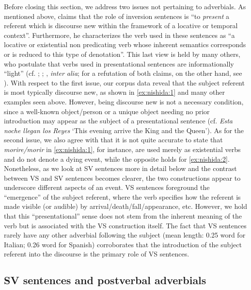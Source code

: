 \documentclass[output=paper,colorlinks,citecolor=brown,
]{langscibook}
\begin{document}
Before closing this section, we address two issues not pertaining to adverbials. As mentioned above, \citet[2, original italics]{cornish2005cross} claims that the role of inversion sentences is ``to \textit{present} a referent which is discourse new within the framework of a locative or temporal context''. Furthermore, he characterizes the verb used in these sentences as ``a locative or existential non predicating verb whose inherent semantics corresponds or is reduced to this type of denotation''. This last view is held by many others, who postulate that verbs used in presentational sentences are informationally ``light'' (cf. \citealt{suner1982}; \citealt{birner1994information}; \citealt{zubizarreta1998}, \textit{inter alia}; for a refutation of both claims, on the other hand, see \citealt{marandin2010subject}). With respect to the first issue, our corpus data reveal that the subject referent is most typically discourse new, as shown in \ref{ex:nishida:1} and many other examples seen above. However, being discourse new is not a necessary condition, since a well-known object/person or a unique object needing no prior introduction may appear as the subject of a presentational sentence (cf. \textit{Esta noche llegan los Reyes} `This evening arrive the King and the Queen'). As for the second issue, we also agree with \citet{marandin2010subject} that it is not quite accurate to state that \textit{morire/morir} in \ref{ex:nishida:1}, for instance, are used merely as existential verbs and do not denote a dying event, while the opposite holds for \ref{ex:nishida:2}. Nonetheless, as we look at SV sentences more in detail below and the contrast between VS and SV sentences becomes clearer, the two constructions appear to underscore different aspects of an event. VS sentences foreground the ``emergence'' of the subject referent, where the verb specifies how the referent is made visible (or audible) by arrival/death/fall/appearance, etc. However, we hold that this ``presentational'' sense does not stem from the inherent meaning of the verb but is associated with the VS construction itself. The fact that VS sentences rarely have any other adverbial following the subject (mean length: 0.25 word for Italian; 0.26 word for Spanish) corroborates that the introduction of the subject referent into the discourse is the primary role of VS sentences.

\subsection{SV sentences and postverbal adverbials}
\end{document}
